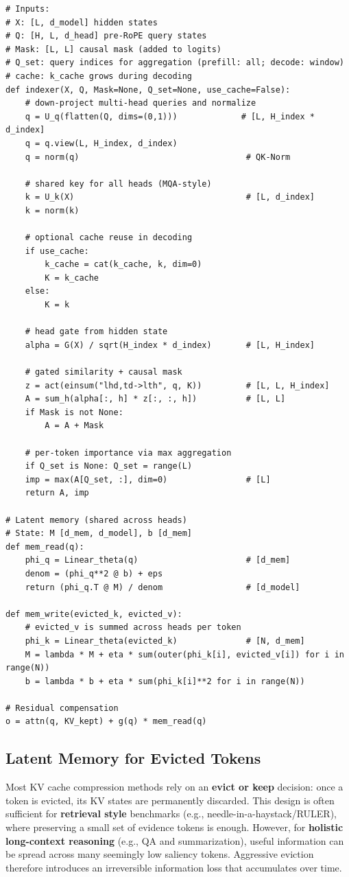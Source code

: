 \begin{algorithm}[t]
\caption{Indexer and latent memory (PyTorch-like)}
\label{alg:indexmem_pseudocode}
\begin{lstlisting}
# Inputs:
# X: [L, d_model] hidden states
# Q: [H, L, d_head] pre-RoPE query states
# Mask: [L, L] causal mask (added to logits)
# Q_set: query indices for aggregation (prefill: all; decode: window)
# cache: k_cache grows during decoding
def indexer(X, Q, Mask=None, Q_set=None, use_cache=False):
    # down-project multi-head queries and normalize
    q = U_q(flatten(Q, dims=(0,1)))             # [L, H_index * d_index]
    q = q.view(L, H_index, d_index)
    q = norm(q)                                  # QK-Norm

    # shared key for all heads (MQA-style)
    k = U_k(X)                                   # [L, d_index]
    k = norm(k)

    # optional cache reuse in decoding
    if use_cache:
        k_cache = cat(k_cache, k, dim=0)
        K = k_cache
    else:
        K = k

    # head gate from hidden state
    alpha = G(X) / sqrt(H_index * d_index)       # [L, H_index]

    # gated similarity + causal mask
    z = act(einsum("lhd,td->lth", q, K))         # [L, L, H_index]
    A = sum_h(alpha[:, h] * z[:, :, h])          # [L, L]
    if Mask is not None:
        A = A + Mask

    # per-token importance via max aggregation
    if Q_set is None: Q_set = range(L)
    imp = max(A[Q_set, :], dim=0)                # [L]
    return A, imp

# Latent memory (shared across heads)
# State: M [d_mem, d_model], b [d_mem]
def mem_read(q):
    phi_q = Linear_theta(q)                      # [d_mem]
    denom = (phi_q**2 @ b) + eps
    return (phi_q.T @ M) / denom                 # [d_model]

def mem_write(evicted_k, evicted_v):
    # evicted_v is summed across heads per token
    phi_k = Linear_theta(evicted_k)              # [N, d_mem]
    M = lambda * M + eta * sum(outer(phi_k[i], evicted_v[i]) for i in range(N))
    b = lambda * b + eta * sum(phi_k[i]**2 for i in range(N))

# Residual compensation
o = attn(q, KV_kept) + g(q) * mem_read(q)
\end{lstlisting}
\end{algorithm}

\subsection{Latent Memory for Evicted Tokens}
Most KV cache compression methods rely on an \textbf{evict or keep} decision: once a token is evicted, its KV states are permanently discarded. This design is often sufficient for \textbf{retrieval style} benchmarks (e.g., needle-in-a-haystack/RULER), where preserving a small set of evidence tokens is enough. However, for \textbf{holistic long-context reasoning} (e.g., QA and summarization), useful information can be spread across many seemingly low saliency tokens. Aggressive eviction therefore introduces an irreversible information loss that accumulates over time.

